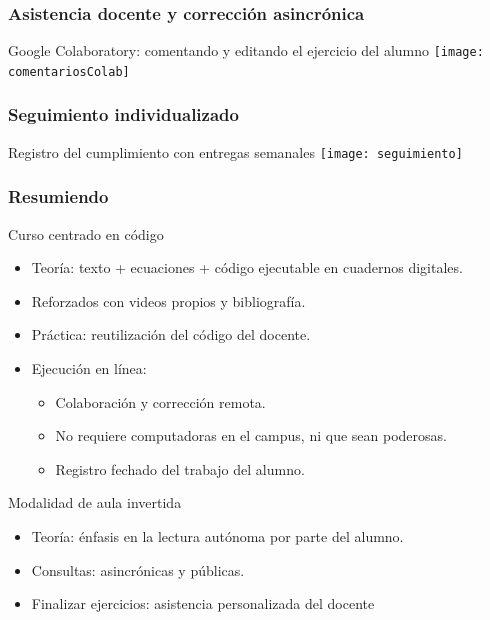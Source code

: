 \documentclass[aspectratio=43]{beamer}
\begin{document}
\begin{frame}
	\frametitle{Asistencia docente y corrección asincrónica}
	\begin{block}{Google Colaboratory: comentando y editando el ejercicio del alumno}
		\texttt{[image: comentariosColab]}
	\end{block}
\end{frame}


\begin{frame}
	\frametitle{Seguimiento individualizado}
	\begin{block}{Registro del cumplimiento con entregas semanales}
		\texttt{[image: seguimiento]}
	\end{block}
\end{frame}


\begin{frame}
	\frametitle{Resumiendo}
	\begin{block}{Curso centrado en código}
		\begin{itemize}[<+->]
			\item Teoría: texto + ecuaciones + código ejecutable en cuadernos digitales.
			\item Reforzados con videos propios y bibliografía.
			\item Práctica: reutilización del código del docente.
			\item Ejecución en línea:
			\begin{itemize}[<+->]
				\item Colaboración y corrección remota.
				\item No requiere computadoras en el campus, ni que sean poderosas.
				\item Registro fechado del trabajo del alumno.
			\end{itemize}
		\end{itemize}
	\end{block}
	\begin{block}{Modalidad de aula invertida}
		\begin{itemize}[<+->]
			\item Teoría: énfasis en la lectura autónoma por parte del alumno.
			\item Consultas: asincrónicas y públicas.
			\item Finalizar ejercicios: asistencia personalizada del docente
		\end{itemize}
	\end{block}
\end{frame}
	
\end{document}
